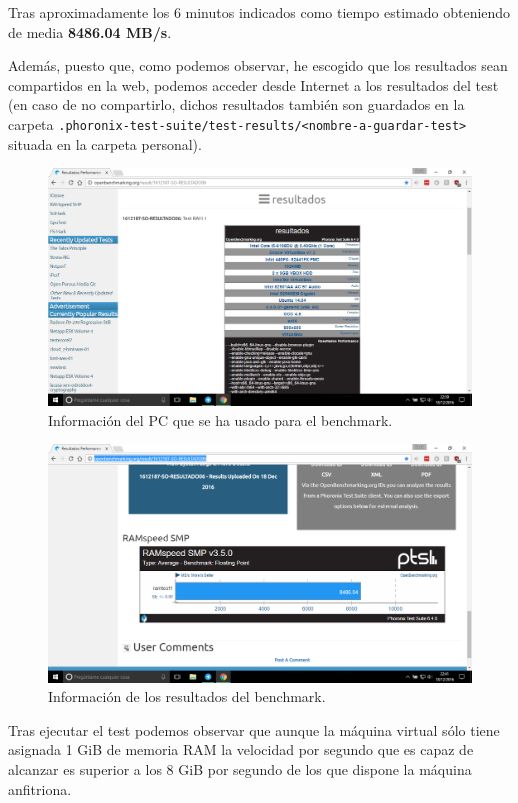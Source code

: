 Tras aproximadamente los 6 minutos indicados como tiempo estimado obteniendo de media \textbf{8486.04 MB/s}. 

Además, puesto que, como podemos observar, he escogido que los resultados sean compartidos en la web, podemos acceder desde Internet a los resultados del test (en caso de no compartirlo, dichos resultados también son guardados en la carpeta \linebreak \verb|.phoronix-test-suite/test-results/<nombre-a-guardar-test>| situada en la carpeta personal).

\begin{figure}[H]
	\centering
	\includegraphics[scale=0.4]{phoronixResult.png}
	\caption{Información del PC que se ha usado para el benchmark.}
\end{figure}

\begin{figure}[H]
	\centering
	\includegraphics[scale=0.4]{phoronixResult2.png}
	\caption{Información de los resultados del benchmark.}
\end{figure}

Tras ejecutar el test podemos observar que aunque la máquina virtual sólo tiene asignada 1 GiB de memoria RAM la velocidad por segundo que es capaz de alcanzar es superior a los 8 GiB por segundo de los que dispone la máquina anfitriona.

